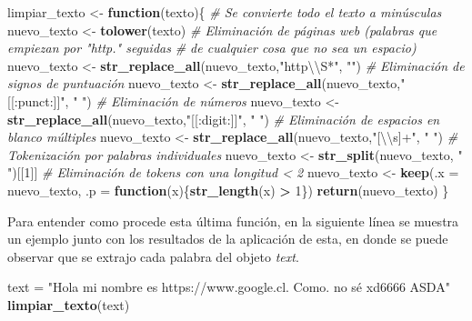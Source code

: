 \documentclass[
]{article}
\newenvironment{Shaded}{\begin{snugshade}}{\end{snugshade}}
\newcommand{\CharTok}[1]{\textcolor[rgb]{0.31,0.60,0.02}{#1}}
\newcommand{\CommentTok}[1]{\textcolor[rgb]{0.56,0.35,0.01}{\textit{#1}}}
\newcommand{\ControlFlowTok}[1]{\textcolor[rgb]{0.13,0.29,0.53}{\textbf{#1}}}
\newcommand{\DataTypeTok}[1]{\textcolor[rgb]{0.13,0.29,0.53}{#1}}
\newcommand{\DecValTok}[1]{\textcolor[rgb]{0.00,0.00,0.81}{#1}}
\newcommand{\KeywordTok}[1]{\textcolor[rgb]{0.13,0.29,0.53}{\textbf{#1}}}
\newcommand{\NormalTok}[1]{#1}
\newcommand{\OperatorTok}[1]{\textcolor[rgb]{0.81,0.36,0.00}{\textbf{#1}}}
\newcommand{\StringTok}[1]{\textcolor[rgb]{0.31,0.60,0.02}{#1}}
\begin{document}
\begin{Shaded}
\begin{Highlighting}[]
\NormalTok{limpiar_texto <-}\StringTok{ }\ControlFlowTok{function}\NormalTok{(texto)\{}
    \CommentTok{# Se convierte todo el texto a minúsculas}
\NormalTok{    nuevo_texto <-}\StringTok{ }\KeywordTok{tolower}\NormalTok{(texto)}
    \CommentTok{# Eliminación de páginas web (palabras que empiezan por "http." seguidas }
    \CommentTok{# de cualquier cosa que no sea un espacio)}
\NormalTok{    nuevo_texto <-}\StringTok{ }\KeywordTok{str_replace_all}\NormalTok{(nuevo_texto,}\StringTok{"http}\CharTok{\textbackslash{}\textbackslash{}}\StringTok{S*"}\NormalTok{, }\StringTok{""}\NormalTok{)}
    \CommentTok{# Eliminación de signos de puntuación}
\NormalTok{    nuevo_texto <-}\StringTok{ }\KeywordTok{str_replace_all}\NormalTok{(nuevo_texto,}\StringTok{"[[:punct:]]"}\NormalTok{, }\StringTok{" "}\NormalTok{)}
    \CommentTok{# Eliminación de números}
\NormalTok{    nuevo_texto <-}\StringTok{ }\KeywordTok{str_replace_all}\NormalTok{(nuevo_texto,}\StringTok{"[[:digit:]]"}\NormalTok{, }\StringTok{" "}\NormalTok{)}
    \CommentTok{# Eliminación de espacios en blanco múltiples}
\NormalTok{    nuevo_texto <-}\StringTok{ }\KeywordTok{str_replace_all}\NormalTok{(nuevo_texto,}\StringTok{"[}\CharTok{\textbackslash{}\textbackslash{}}\StringTok{s]+"}\NormalTok{, }\StringTok{" "}\NormalTok{)}
    \CommentTok{# Tokenización por palabras individuales}
\NormalTok{    nuevo_texto <-}\StringTok{ }\KeywordTok{str_split}\NormalTok{(nuevo_texto, }\StringTok{" "}\NormalTok{)[[}\DecValTok{1}\NormalTok{]]}
    \CommentTok{# Eliminación de tokens con una longitud < 2}
\NormalTok{    nuevo_texto <-}\StringTok{ }\KeywordTok{keep}\NormalTok{(}\DataTypeTok{.x =}\NormalTok{ nuevo_texto, }\DataTypeTok{.p =} \ControlFlowTok{function}\NormalTok{(x)\{}\KeywordTok{str_length}\NormalTok{(x) }\OperatorTok{>}\StringTok{ }\DecValTok{1}\NormalTok{\})}
    \KeywordTok{return}\NormalTok{(nuevo_texto)}
\NormalTok{\}}
\end{Highlighting}
\end{Shaded}

Para entender como procede esta última función, en la siguiente línea se
muestra un ejemplo junto con los resultados de la aplicación de esta, en
donde se puede observar que se extrajo cada palabra del objeto
\emph{text}.

\begin{Shaded}
\begin{Highlighting}[]
\NormalTok{text =}\StringTok{ "Hola mi nombre es https://www.google.cl. Como. no sé xd6666 ASDA"}
\KeywordTok{limpiar_texto}\NormalTok{(text)}
\end{Highlighting}
\end{Shaded}
\end{document}
